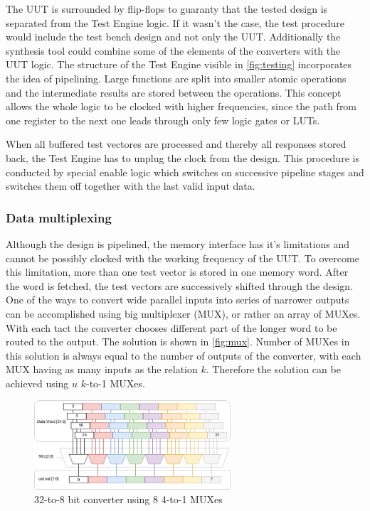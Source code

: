 The UUT is surrounded by flip-flops to guaranty that the tested design is separated from the Test Engine logic. If it wasn't the case, the test procedure would include the test bench design and not only the UUT. Additionally the synthesis tool could combine some of the elements of the converters with the UUT logic. The structure of the Test Engine visible in \autoref{fig:testing} incorporates the idea of pipelining. Large functions are split into smaller atomic operations and the intermediate results are stored between the operations. This concept allows the whole logic to be clocked with higher frequencies, since the path from one register to the next one leads through only few logic gates or LUTs. 

When all buffered test vectores are processed and thereby all responses stored back, the Test Engine has to unplug the clock from the design. This procedure is conducted by special enable logic which switches on successive pipeline stages and switches them off together with the last valid input data.

\subsubsection{Data multiplexing}\label{subsec:mux}
Although the design is pipelined, the memory interface has it's limitations and cannot be possibly clocked with the working frequency of the UUT. To overcome this limitation, more than one test vector is stored in one memory word. After the word is fetched, the test vectors are successively shifted through the design. One of the ways to convert wide parallel inputs into series of narrower outputs can be accomplished using big multiplexer (MUX), or rather an array of MUXes. With each tact the converter chooses different part of the longer word to be routed to the output. The solution is shown in \autoref{fig:mux}. Number of MUXes in this solution is always equal to the number of outputs of the converter, with each MUX having as many inputs as the relation $k$. Therefore the solution can be achieved using $u$ $k$-to-1 MUXes.
\begin{figure}[h]
\centering
\includegraphics[width=0.65\textwidth]{figures/MUX.png}
\caption{32-to-8 bit converter using 8 4-to-1 MUXes}
\label{fig:mux}
\end{figure}

